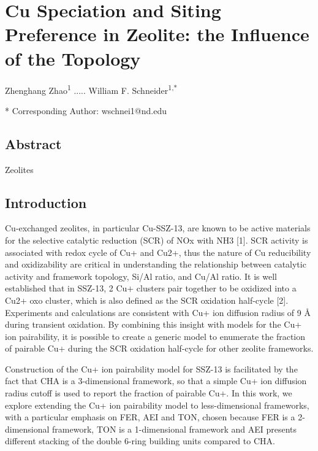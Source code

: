 \documentclass[12pt]{article}
\begin{document}
\section*{Cu Speciation and Siting Preference in Zeolite: the Influence of the Topology}

Zhenghang Zhao\textsuperscript{1} ..... William F. Schneider\textsuperscript{1,*}

{\small
{}
* Corresponding Author: wschnei1@nd.edu 
}

\subsection*{Abstract}

Zeolites

\subsection*{Introduction}

Cu-exchanged zeolites, in particular Cu-SSZ-13, are known to be active materials for the selective catalytic reduction (SCR) of NOx with NH3 [1]. SCR activity is associated with redox cycle of Cu+ and Cu2+, thus the nature of Cu reducibility and oxidizability are critical in understanding the relationship between catalytic activity and framework topology, Si/Al ratio, and Cu/Al ratio. It is well established that in SSZ-13, 2 Cu+ clusters pair together to be oxidized into a Cu2+ oxo cluster, which is also defined as the SCR oxidation half-cycle [2]. Experiments and calculations are consistent with Cu+ ion diffusion radius of 9 Å during transient oxidation. By combining this insight with models for the Cu+ ion pairability, it is possible to create a generic model to enumerate the fraction of pairable Cu+ during the SCR oxidation half-cycle for other zeolite frameworks.

Construction of the Cu+ ion pairability model for SSZ-13 is facilitated by the fact that CHA is a 3-dimensional framework, so that a simple Cu+ ion diffusion radius cutoff is used to report the fraction of pairable Cu+. In this work, we explore extending the Cu+ ion pairability model to less-dimensional frameworks, with a particular emphasis on FER, AEI and TON, chosen because FER is a 2-dimensional framework, TON is a 1-dimensional framework and AEI presents different stacking of the double 6-ring building units compared to CHA.
\end{document}
